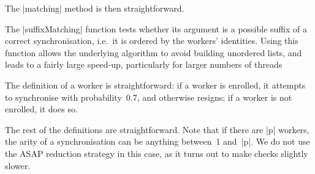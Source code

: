 The |matching| method is then straightforward. 

The |suffixMatching| function tests whether its argument is a possible suffix
of a correct synchronisation, i.e.~it is ordered by the workers' identities.
Using this function allows the underlying algorithm to avoid building
unordered lists, and leads to a fairly large speed-up, particularly for larger
numbers of threads 

The definition of a worker is straightforward: if a worker is enrolled, it
attempts to synchronise with probability~$0.7$, and otherwise resigns; if a
worker is not enrolled, it does so.  

The rest of the definitions are straightforward.  Note that if there are |p|
workers, the arity of a synchronisation can be anything between~1 and~|p|.  We
do not use the ASAP reduction strategy in this case, as it turns out to make
checks slightly slower. 

